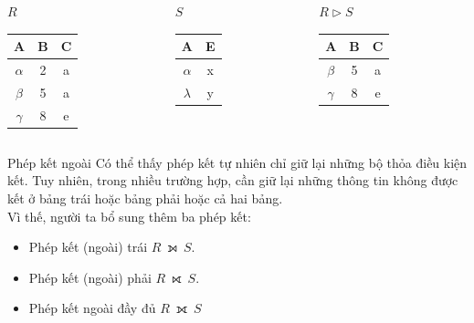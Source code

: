 \documentclass[11pt]{beamer}
\begin{document}
  \begin{frame}
    \begin{columns}[T]
      \begin{column}{0.3\textwidth}
        \centering $R$
        \medskip \\
        \begin{tabular}{|c|c|c|}
          \hline
          \textbf{A} & \textbf{B} & \textbf{C}  \\[0.5ex] \hline\hline
          $\alpha$ & 2 & a\\ \hline
          $\beta$ & 5 & a\\ \hline
          $\gamma$ & 8 & e\\ \hline
        \end{tabular}
      \end{column}
      \begin{column}{0.3\textwidth}
        \centering $S$
        \medskip \\
        \begin{tabular}{|c|c|}
          \hline
          \textbf{A} & \textbf{E} \\[0.5ex] \hline\hline
          $\alpha$ & x\\ \hline
          $\lambda$ & y\\ \hline
        \end{tabular}
      \end{column}
      \begin{column}{0.3\textwidth}
        \centering $R \rhd S$
        \medskip \\
        \begin{tabular}{|c|c|c|}
          \hline
          \textbf{A} & \textbf{B} & \textbf{C}\\[0.5ex] \hline\hline
          $\beta$ & 5 & a\\ \hline
          $\gamma$ & 8 & e\\ \hline
        \end{tabular}
      \end{column}
    \end{columns}
  \end{frame}
  \begin{frame}{Phép kết ngoài}
    Có thể thấy phép kết tự nhiên chỉ giữ lại những bộ thỏa điều kiện kết.
    Tuy nhiên, trong nhiều trường hợp, cần giữ lại những thông tin không được kết 
    ở bảng trái hoặc bảng phải hoặc cả hai bảng. \\
    Vì thế, người ta bổ sung thêm ba phép kết:
    \begin{itemize}
      \item Phép kết (ngoài) trái $R~⟕~S$.
      \item Phép kết (ngoài) phải $R~⟖~S$.
      \item Phép kết ngoài đầy đủ $R~⟗~S$
    \end{itemize}
  \end{frame}
\end{document}
